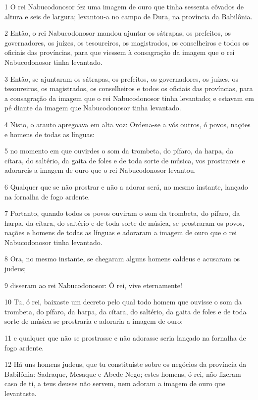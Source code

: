 \par 1 O rei Nabucodonosor fez uma imagem de ouro que tinha sessenta côvados de altura e seis de largura; levantou-a no campo de Dura, na província da Babilônia.
\par 2 Então, o rei Nabucodonosor mandou ajuntar os sátrapas, os prefeitos, os governadores, os juízes, os tesoureiros, os magistrados, os conselheiros e todos os oficiais das províncias, para que viessem à consagração da imagem que o rei Nabucodonosor tinha levantado.
\par 3 Então, se ajuntaram os sátrapas, os prefeitos, os governadores, os juízes, os tesoureiros, os magistrados, os conselheiros e todos os oficiais das províncias, para a consagração da imagem que o rei Nabucodonosor tinha levantado; e estavam em pé diante da imagem que Nabucodonosor tinha levantado.
\par 4 Nisto, o arauto apregoava em alta voz: Ordena-se a vós outros, ó povos, nações e homens de todas as línguas:
\par 5 no momento em que ouvirdes o som da trombeta, do pífaro, da harpa, da cítara, do saltério, da gaita de foles e de toda sorte de música, vos prostrareis e adorareis a imagem de ouro que o rei Nabucodonosor levantou.
\par 6 Qualquer que se não prostrar e não a adorar será, no mesmo instante, lançado na fornalha de fogo ardente.
\par 7 Portanto, quando todos os povos ouviram o som da trombeta, do pífaro, da harpa, da cítara, do saltério e de toda sorte de música, se prostraram os povos, nações e homens de todas as línguas e adoraram a imagem de ouro que o rei Nabucodonosor tinha levantado.
\par 8 Ora, no mesmo instante, se chegaram alguns homens caldeus e acusaram os judeus;
\par 9 disseram ao rei Nabucodonosor: Ó rei, vive eternamente!
\par 10 Tu, ó rei, baixaste um decreto pelo qual todo homem que ouvisse o som da trombeta, do pífaro, da harpa, da cítara, do saltério, da gaita de foles e de toda sorte de música se prostraria e adoraria a imagem de ouro;
\par 11 e qualquer que não se prostrasse e não adorasse seria lançado na fornalha de fogo ardente.
\par 12 Há uns homens judeus, que tu constituíste sobre os negócios da província da Babilônia: Sadraque, Mesaque e Abede-Nego; estes homens, ó rei, não fizeram caso de ti, a teus deuses não servem, nem adoram a imagem de ouro que levantaste.
